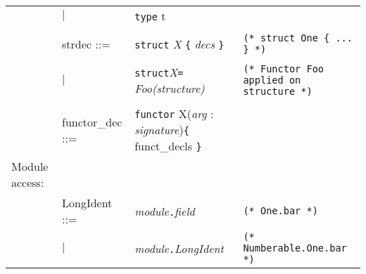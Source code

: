 \begin{tabular}{p{4em} p{7em} p{15em} p{16em}}
                & $|$
                  & \texttt{type} t  & \\
                \\
                & strdec ::=
                  & \texttt{struct} \textit{X} \texttt{\{} \textit{decs}  \texttt{\}}
                    & \texttt{(* struct One \{ ... \} *)} \\
                \\
                & $|$
                  & \texttt{struct}\textit{X}\texttt{=} \textit{Foo(structure)}
                    & \texttt{(* Functor Foo applied on structure *)}  \\
                \\
                & functor\_dec ::=
                  & \texttt{functor} X(\textit{arg} : \textit{signature})\texttt{\{} funct\_decls \texttt{\}} & \\
Module access:  &&& \\
                & LongIdent ::=
                  & \textit{module}\texttt{.}\textit{field}
                    & \texttt{(* One.bar *)} \\
                &$|$
                  & \textit{module}\texttt{.}\textit{LongIdent}
                    & \texttt{(* Numberable.One.bar *)} \\
\end{tabular}